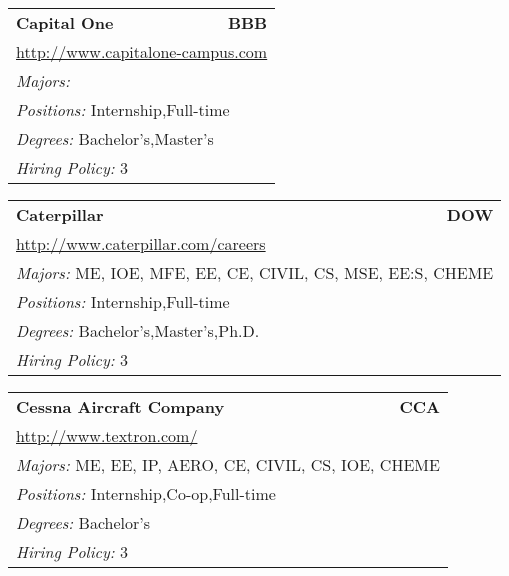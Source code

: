 \documentclass[twoside]{article}
\begin{document}
\begin{center}
\begin{multicols}{3}
\begin{FlushLeft}
\begin{minipage}{\columnwidth}
\end{minipage}
 
\begin{minipage}{\columnwidth}\begin{tabularx}{.95\columnwidth}{Xr}
                 {\Large\bf Capital One} & {\Large\bf BBB}\\
    \multicolumn{2}{p{.95\columnwidth}}{\url{http://www.capitalone-campus.com}}\\
    \multicolumn{2}{p{.95\columnwidth}}{\emph{Majors:} }\\
    \multicolumn{2}{p{.95\columnwidth}}{\emph{Positions:} Internship,Full-time}\\
    \multicolumn{2}{p{.95\columnwidth}}{\emph{Degrees:} Bachelor's,Master's}\\
    \multicolumn{2}{p{.95\columnwidth}}{\emph{Hiring Policy:} 3}\\
    \end{tabularx}
    
\end{minipage}
 
\begin{minipage}{\columnwidth}\begin{tabularx}{.95\columnwidth}{Xr}
                 {\Large\bf Caterpillar} & {\Large\bf DOW}\\
    \multicolumn{2}{p{.95\columnwidth}}{\url{http://www.caterpillar.com/careers}}\\
    \multicolumn{2}{p{.95\columnwidth}}{\emph{Majors:} ME, IOE, MFE, EE, CE, CIVIL, CS, MSE, EE:S, CHEME}\\
    \multicolumn{2}{p{.95\columnwidth}}{\emph{Positions:} Internship,Full-time}\\
    \multicolumn{2}{p{.95\columnwidth}}{\emph{Degrees:} Bachelor's,Master's,Ph.D.}\\
    \multicolumn{2}{p{.95\columnwidth}}{\emph{Hiring Policy:} 3}\\
    \end{tabularx}
    
\end{minipage}
 
\begin{minipage}{\columnwidth}\begin{tabularx}{.95\columnwidth}{Xr}
                 {\Large\bf Cessna Aircraft Company} & {\Large\bf CCA}\\
    \multicolumn{2}{p{.95\columnwidth}}{\url{http://www.textron.com/}}\\
    \multicolumn{2}{p{.95\columnwidth}}{\emph{Majors:} ME, EE, IP, AERO, CE, CIVIL, CS, IOE, CHEME}\\
    \multicolumn{2}{p{.95\columnwidth}}{\emph{Positions:} Internship,Co-op,Full-time}\\
    \multicolumn{2}{p{.95\columnwidth}}{\emph{Degrees:} Bachelor's}\\
    \multicolumn{2}{p{.95\columnwidth}}{\emph{Hiring Policy:} 3}\\
    \end{tabularx}
    

\end{minipage}
\end{FlushLeft}
\end{multicols}
\end{center}
\end{document}
